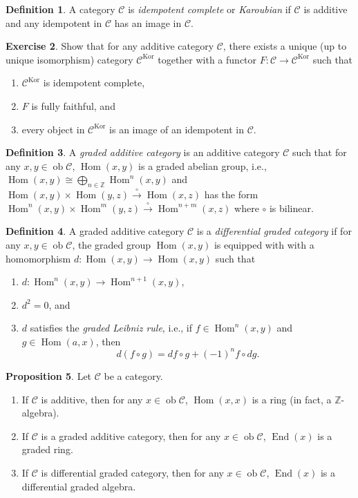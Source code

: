\documentclass[10pt,letterpaper,cm]{nupset}
\theoremstyle{definition}
\newtheorem{definition}{Definition}[subsection]
\theoremstyle{theorem}
\newtheorem{prop}[definition]{Proposition}
\newtheorem{exercise}[definition]{Exercise}
\theoremstyle{remark}
\newcommand{\Z}{\mathbb Z}
\newcommand{\1}{\mathbf{1}}
\renewcommand{\c}{\mathscr{C}}
\newcommand{\0}{\vec 0}
\DeclareMathOperator{\ed}{End}
\DeclareMathOperator{\ob}{ob}
\DeclareMathOperator{\Hom}{Hom}
\DeclareMathOperator{\kor}{Kor}
\begin{document}
\begin{definition}
A category $\c$ is \textit{idempotent complete} or \textit{Karoubian} if $\c$ is additive and any idempotent in $\c$ has an image in $\c$.
\end{definition}

\begin{exercise}
Show that for any additive category $\c$, there exists a unique (up to unique isomorphism) category $\c^{\kor}$ together with a functor $F : \c \to \c^{\kor}$ such that 
\begin{enumerate}
\item $\c^{\kor}$ is idempotent complete,
\item $F$ is fully faithful, and
\item every object in $\c^{\kor}$  is an image of an idempotent in $\c$.
\end{enumerate}
\end{exercise}

\begin{definition}
A \textit{graded additive category} is an additive category $\c$ such that for any $x,y \in \ob{\c}$, $\Hom(x,y)$ is a graded abelian group, i.e., $\Hom(x,y) \cong \bigoplus_{n \in \Z} \Hom^n(x,y)$ and $\Hom(x,y) \times \Hom(y,z) \overset{\circ}{\longrightarrow} \Hom(x,z)$ has the form $\Hom^n(x,y) \times \Hom^m(y,z) \overset{\circ}{\longrightarrow} \Hom^{n+m}(x,z)$ where $\circ$ is bilinear. 
\end{definition}

\begin{definition}
A graded additive category $\c$ is a \textit{differential graded category} if for any $x,y \in \ob{\c}$, the graded group $\Hom(x,y)$ is equipped with with a homomorphism $d : \Hom(x,y) \to \Hom(x,y)$ such that
\begin{enumerate}[label=(\alph*)]
\item $d : \Hom^n(x,y) \to \Hom^{n+1}(x,y)$,
\item $d^2 =0$, and
\item $d$ satisfies the \textit{graded Leibniz rule}, i.e., if $f \in \Hom^n(x,y)$ and $g \in \Hom(a,x)$, then $$  d(f\circ g) = df\circ g +({-1})^nf \circ dg  .$$
\end{enumerate}
\end{definition}

\begin{prop} Let $\c$ be a category.
\begin{enumerate}
\item If $\c$ is additive, then for any $x\in \ob{\c}$, $\Hom(x,x)$ is a ring (in fact, a $\Z$-algebra).
\item If $\c$ is a graded additive category, then for any $x\in \ob{\c}$, $\ed(x)$ is a graded ring.
\item If $\c$ is differential graded category, then for any $x\in \ob{\c}$, $\ed(x)$ is a differential graded algebra.
\end{enumerate}
\end{prop}
\end{document}
